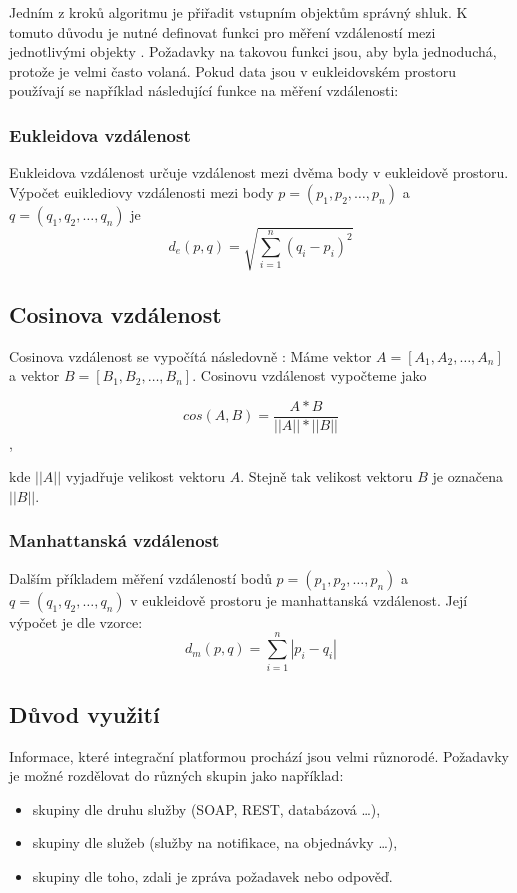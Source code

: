 \documentclass[thesis=M,czech]{FITthesis}[2012/10/20]
\begin{document}
			Jedním z kroků algoritmu je přiřadit vstupním objektům správný shluk. K tomuto důvodu je nutné definovat funkci pro měření vzdáleností mezi jednotlivými objekty \cite{IntroductionToDataMining}. Požadavky na takovou funkci jsou, aby byla jednoduchá, protože je velmi často volaná. Pokud data jsou v eukleidovském prostoru používají se například následující funkce na měření vzdálenosti:
			
				\subsubsection{Eukleidova vzdálenost}
				\label{sec:eukleid_distance}
				Eukleidova vzdálenost určuje vzdálenost mezi dvěma body v eukleidově prostoru. Výpočet euiklediovy vzdálenosti mezi body $p = (p_1, p_2, \ldots, p_n)$ a $q = (q_1, q_2, \ldots, q_n)$ je
				$$d_e(p,q) = \sqrt{\sum_{i = 1}^{n}(q_i - p_i)^2}$$
				
				\subsection{Cosinova vzdálenost}
				\label{sec:cosine_distance}
				Cosinova vzdálenost se vypočítá následovně \cite{cosine-similarity}: Máme vektor $A = [A_1,A_2,\ldots,A_n]$ a vektor $B = [B_1,B_2,\ldots,B_n]$. Cosinovu vzdálenost vypočteme jako
				
				$$cos(A,B) = \frac{A*B}{||A|| * ||B||}$$,
				
				kde $||A||$ vyjadřuje velikost vektoru $A$. Stejně tak velikost vektoru $B$ je označena $||B||$.
				
		
				
				\subsubsection{Manhattanská vzdálenost}
				Dalším příkladem měření vzdáleností bodů $p = (p_1, p_2, \ldots, p_n)$ a $q = (q_1, q_2, \ldots, q_n)$ v eukleidově prostoru je manhattanská vzdálenost. Její výpočet je dle vzorce:
				$$d_m(p,q) = \sum_{i = 1}^{n} |p_i - q_i| $$
				
		\subsection{Důvod využití}
			Informace, které integrační platformou prochází jsou velmi různorodé. Požadavky je možné rozdělovat do různých skupin jako například:
			
			\begin{itemize} 
				\item skupiny dle druhu služby (SOAP, REST, databázová \ldots),
				\item skupiny dle služeb (služby na notifikace, na objednávky \ldots),
				\item skupiny dle toho, zdali je zpráva požadavek nebo odpověď.		
			\end{itemize}
		
\end{document}
